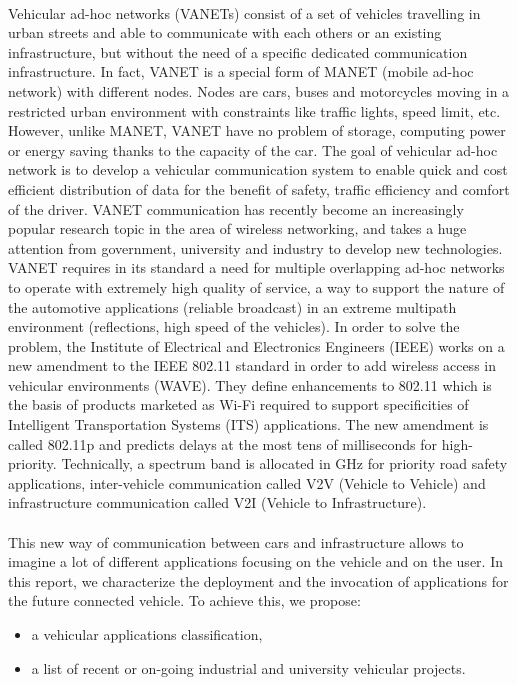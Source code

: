 \documentclass[a4paper]{article}
\begin{document}
\paragraph{}Vehicular ad-hoc networks (VANETs) consist of a set of vehicles travelling in urban streets and able to communicate with each others or an existing infrastructure, but without the need of a specific dedicated communication infrastructure. In fact, VANET is a special form of MANET (mobile ad-hoc network) with different nodes. Nodes are cars, buses and motorcycles moving in a restricted urban environment with constraints like traffic lights, speed limit, etc. However, unlike MANET, VANET have no problem of storage, computing power or energy saving thanks to the capacity of the car. The goal of vehicular ad-hoc network is to develop a vehicular communication system to enable quick and cost efficient distribution of data for the benefit of safety, traffic efficiency and comfort of the driver. VANET communication has recently become an increasingly popular research topic in the area of wireless networking, and takes a huge attention from government, university and industry to develop new technologies. VANET requires in its standard a need for multiple overlapping ad-hoc networks to operate with extremely high quality of service, a way to support the nature of the automotive applications (reliable broadcast) in an extreme multipath environment (reflections, high speed of the vehicles). In order to solve the problem, the Institute of Electrical and Electronics Engineers (IEEE) works on a new amendment to the IEEE 802.11 standard in order to add wireless access in vehicular environments (WAVE). They define enhancements to 802.11 which is the basis of products marketed as Wi-Fi required to support specificities of Intelligent Transportation Systems (ITS) applications. The new amendment is called 802.11p and predicts delays at the most tens of milliseconds for high-priority. Technically, a spectrum band is allocated in  GHz for priority road safety applications, inter-vehicle communication called V2V (Vehicle to Vehicle) and infrastructure communication called V2I (Vehicle to Infrastructure). 


\paragraph{}This new way of communication between cars and infrastructure allows to imagine a lot of different applications focusing on the vehicle and on the user. In this report, we characterize the deployment and the invocation of applications for the future connected vehicle. To achieve this, we propose:
\begin{itemize}
\item a vehicular applications classification,
\item a list of recent or on-going industrial and university vehicular projects.
\end{itemize}
\end{document}

